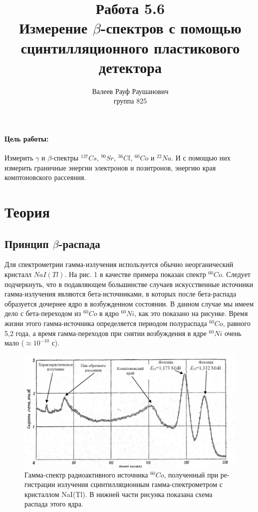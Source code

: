 \documentclass[a4paper, 12pt]{article}%
\author{Валеев Рауф Раушанович \\
группа 825}
\title{\textbf{Работа 5.6\\
Измерение $\beta$-спектров с помощью сцинтилляционного пластикового детектора}}
\begin{document}
\maketitle
\newpage
\paragraph*{Цель работы:} Измерить $\gamma$ и $\beta$-спектры $^{137}Cs$, $^{90}Sr$, $^{36}Cl$, $^{60}Co$ и $^{22}Na$. И с помощью них измерить граничные энергии электронов и позитронов, энергию края комптоновского рассеяния.
\section*{Теория}
\subsection*{Принцип $\beta$-распада}
Для спектрометрии гамма-излучения используется обычно неорганический кристалл $NaI(Tl)$. На рис. 1 в качестве примера показан спектр $^{60}Co$. Следует подчеркнуть, что в подавляющем большинстве случаев искусственные источники гамма-излучения являются бета-источниками, в которых после бета-распада образуется дочернее ядро в возбужденном состоянии. В данном случае мы имеем дело с бета-переходом из $^{60}Co$ в ядро $^{60}Ni$, как это показано на рисунке. Время жизни этого гамма-источника определяется периодом полураспада $^{60}Co$, равного 5,2 года, а время гамма-переходов при снятии возбуждения в ядре $^{60}Ni$ очень мало ($\approx 10^{-10}$ с).

\begin{figure}[h]
\begin{center}
\includegraphics[width = \textwidth]{1.jpg}
\caption{Гамма-спектр радиоактивного источника $^{60}Co$, полученный при ре-гистрации излучения сцинтилляционным гамма-спектрометром с кристаллом NaI(Tl). В нижней части рисунка показана схема распада этого ядра.}
\end{center}
\end{figure}
\end{document}
